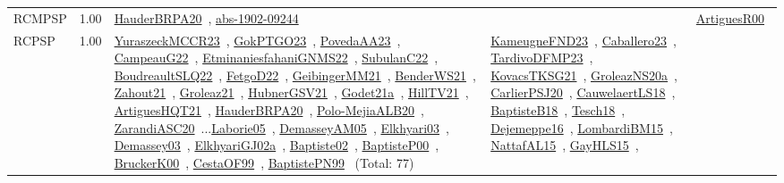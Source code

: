 {\begin{longtable}{p{3cm}r>{\raggedright\arraybackslash}p{6cm}>{\raggedright\arraybackslash}p{6cm}>{\raggedright\arraybackslash}p{8cm}}
\index{RCMPSP}\index{Classification!RCMPSP}RCMPSP &  1.00 & \href{../works/HauderBRPA20.pdf}{HauderBRPA20}~\cite{HauderBRPA20}, \href{../works/abs-1902-09244.pdf}{abs-1902-09244}~\cite{abs-1902-09244} &  & \href{../works/ArtiguesR00.pdf}{ArtiguesR00}~\cite{ArtiguesR00}\\
\index{RCPSP}\index{Classification!RCPSP}RCPSP &  1.00 & \href{../works/YuraszeckMCCR23.pdf}{YuraszeckMCCR23}~\cite{YuraszeckMCCR23}, \href{../works/GokPTGO23.pdf}{GokPTGO23}~\cite{GokPTGO23}, \href{../works/PovedaAA23.pdf}{PovedaAA23}~\cite{PovedaAA23}, \href{../works/CampeauG22.pdf}{CampeauG22}~\cite{CampeauG22}, \href{../works/EtminaniesfahaniGNMS22.pdf}{EtminaniesfahaniGNMS22}~\cite{EtminaniesfahaniGNMS22}, \href{../works/SubulanC22.pdf}{SubulanC22}~\cite{SubulanC22}, \href{../works/BoudreaultSLQ22.pdf}{BoudreaultSLQ22}~\cite{BoudreaultSLQ22}, \href{../works/FetgoD22.pdf}{FetgoD22}~\cite{FetgoD22}, \href{../works/GeibingerMM21.pdf}{GeibingerMM21}~\cite{GeibingerMM21}, \href{../works/BenderWS21.pdf}{BenderWS21}~\cite{BenderWS21}, \href{../works/Zahout21.pdf}{Zahout21}~\cite{Zahout21}, \href{../works/Groleaz21.pdf}{Groleaz21}~\cite{Groleaz21}, \href{../works/HubnerGSV21.pdf}{HubnerGSV21}~\cite{HubnerGSV21}, \href{../works/Godet21a.pdf}{Godet21a}~\cite{Godet21a}, \href{../works/HillTV21.pdf}{HillTV21}~\cite{HillTV21}, \href{../works/ArtiguesHQT21.pdf}{ArtiguesHQT21}~\cite{ArtiguesHQT21}, \href{../works/HauderBRPA20.pdf}{HauderBRPA20}~\cite{HauderBRPA20}, \href{../works/Polo-MejiaALB20.pdf}{Polo-MejiaALB20}~\cite{Polo-MejiaALB20}, \href{../works/ZarandiASC20.pdf}{ZarandiASC20}~\cite{ZarandiASC20}...\href{../works/Laborie05.pdf}{Laborie05}~\cite{Laborie05}, \href{../works/DemasseyAM05.pdf}{DemasseyAM05}~\cite{DemasseyAM05}, \href{../works/Elkhyari03.pdf}{Elkhyari03}~\cite{Elkhyari03}, \href{../works/Demassey03.pdf}{Demassey03}~\cite{Demassey03}, \href{../works/ElkhyariGJ02a.pdf}{ElkhyariGJ02a}~\cite{ElkhyariGJ02a}, \href{../works/Baptiste02.pdf}{Baptiste02}~\cite{Baptiste02}, \href{../works/BaptisteP00.pdf}{BaptisteP00}~\cite{BaptisteP00}, \href{../works/BruckerK00.pdf}{BruckerK00}~\cite{BruckerK00}, \href{../works/CestaOF99.pdf}{CestaOF99}~\cite{CestaOF99}, \href{../works/BaptistePN99.pdf}{BaptistePN99}~\cite{BaptistePN99} (Total: 77) & \href{../works/KameugneFND23.pdf}{KameugneFND23}~\cite{KameugneFND23}, \href{../works/Caballero23.pdf}{Caballero23}~\cite{Caballero23}, \href{../works/TardivoDFMP23.pdf}{TardivoDFMP23}~\cite{TardivoDFMP23}, \href{../works/KovacsTKSG21.pdf}{KovacsTKSG21}~\cite{KovacsTKSG21}, \href{../works/GroleazNS20a.pdf}{GroleazNS20a}~\cite{GroleazNS20a}, \href{../works/CarlierPSJ20.pdf}{CarlierPSJ20}~\cite{CarlierPSJ20}, \href{../works/CauwelaertLS18.pdf}{CauwelaertLS18}~\cite{CauwelaertLS18}, \href{../works/BaptisteB18.pdf}{BaptisteB18}~\cite{BaptisteB18}, \href{../works/Tesch18.pdf}{Tesch18}~\cite{Tesch18}, \href{../works/Dejemeppe16.pdf}{Dejemeppe16}~\cite{Dejemeppe16}, \href{../works/LombardiBM15.pdf}{LombardiBM15}~\cite{LombardiBM15}, \href{../works/NattafAL15.pdf}{NattafAL15}~\cite{NattafAL15}, \href{../works/GayHLS15.pdf}{GayHLS15}~\cite{GayHLS15}, 
\end{longtable}}
